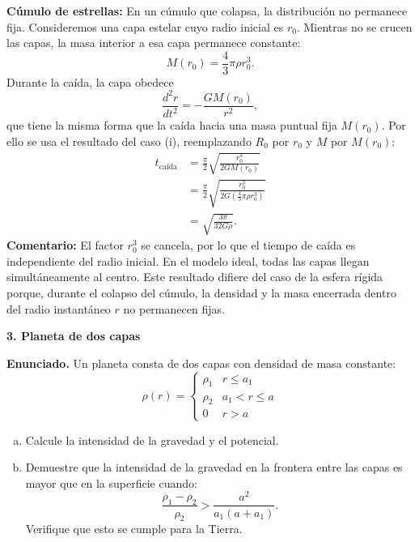 \begin{enumerate}[a)]
    \textbf{Cúmulo de estrellas:} En un cúmulo que colapsa, la distribución no permanece fija. Consideremos una capa estelar cuyo radio inicial es $r_0$. Mientras no se crucen las capas, la masa interior a esa capa permanece constante:
    $$
    M(r_0)=\frac{4}{3}\pi\rho r_0^3.
    $$
    Durante la caída, la capa obedece
    $$
    \frac{d^2r}{dt^2}=-\frac{GM(r_0)}{r^2},
    $$
    que tiene la misma forma que la caída hacia una masa puntual fija $M(r_0)$. Por ello se usa el resultado del caso (i), reemplazando $R_0$ por $r_0$ y $M$ por $M(r_0)$:
    $$
    \begin{aligned}
    t_{\text{caída}}
    &=\frac{\pi}{2}\sqrt{\frac{r_0^3}{2GM(r_0)}}\\
    &=\frac{\pi}{2}\sqrt{
    \frac{r_0^3}{2G\left(\frac{4}{3}\pi\rho r_0^3\right)}}\\
    &=\sqrt{\frac{3\pi}{32G\rho}}.
    \end{aligned}
    $$
    \textbf{Comentario:} El factor $r_0^3$ se cancela, por lo que el tiempo de caída es independiente del radio inicial. En el modelo ideal, todas las capas llegan simultáneamente al centro. Este resultado difiere del caso de la esfera rígida porque, durante el colapso del cúmulo, la densidad y la masa encerrada dentro del radio instantáneo $r$ no permanecen fijas.
\end{enumerate}

\medskip
{\large\bfseries 3. Planeta de dos capas\par}
\smallskip

\textbf{Enunciado.} Un planeta consta de dos capas con densidad de masa constante:
$$
\rho(r) = \begin{cases}
\rho_1 & r \le a_1 \\
\rho_2 & a_1 < r \le a \\
0 & r > a
\end{cases}
$$
\begin{enumerate}[a)]
    \item Calcule la intensidad de la gravedad y el potencial.
    \item Demuestre que la intensidad de la gravedad en la frontera entre las capas es mayor que en la superficie cuando:
    $$
    \frac{\rho_1 - \rho_2}{\rho_2} > \frac{a^2}{a_1(a + a_1)}.
    $$
    Verifique que esto se cumple para la Tierra.
\end{enumerate}

